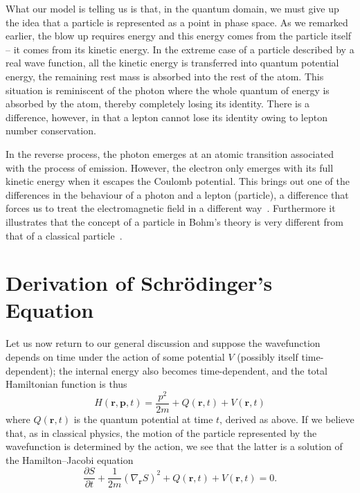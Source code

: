 \documentclass[12pt]{article}%
\begin{document}
What our model is telling us is that, in the quantum domain, we must give up
the idea that a particle is represented as a point in phase space. As we
remarked earlier, the blow up requires energy and this energy comes from the
particle itself -- it comes from its kinetic energy. In the extreme case of a
particle described by a real wave function, all the kinetic energy is
transferred into quantum potential energy, the remaining rest mass is absorbed
into the rest of the atom. This situation is reminiscent of the photon where
the whole quantum of energy is absorbed by the atom, thereby completely losing
its identity. There is a difference, however, in that a lepton cannot lose its
identity owing to lepton number conservation.

In the reverse process, the photon emerges at an atomic transition associated
with the process of emission. However, the electron only emerges with its full
kinetic energy when it escapes the Coulomb potential. This brings out one of
the differences in the behaviour of a photon and a lepton (particle), a
difference that forces us to treat the electromagnetic field in a different
way~\cite{dbbhpk87}. Furthermore it illustrates that the concept of a particle
in Bohm's theory is very different from that of a classical
particle~\cite{ppiibh14}.

\section{Derivation of Schr\"{o}dinger's Equation}

Let us now return to our general discussion and suppose the wavefunction
depends on time under the action of some potential $V$ (possibly itself
time-dependent); the internal energy also becomes time-dependent, and the
total Hamiltonian function is thus%
\begin{equation}
H(\mathbf{r},\mathbf{p},t)=\frac{p^{2}}{2m}+Q(\mathbf{r},t)+V(\mathbf{r},t)
\label{3}%
\end{equation}
where $Q(\mathbf{r},t)$ is the quantum potential at time $t$, derived as
above. If we believe that, as in classical physics, the motion of the particle
represented by the wavefunction is determined by the action, we see that the
latter is a solution of the Hamilton--Jacobi equation%
\begin{equation}
\frac{\partial S}{\partial t}+\frac{1}{2m}(\nabla_{\mathbf{r}}S)^{2}%
+Q(\mathbf{r},t)+V(\mathbf{r},t)=0. \label{4}%
\end{equation}
\end{document}

